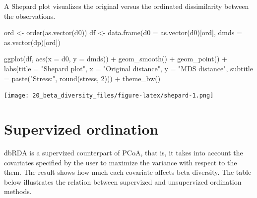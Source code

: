 \documentclass[
]{book}
\newenvironment{Shaded}{\begin{snugshade}}{\end{snugshade}}
\newcommand{\AttributeTok}[1]{\textcolor[rgb]{0.77,0.63,0.00}{#1}}
\newcommand{\DecValTok}[1]{\textcolor[rgb]{0.00,0.00,0.81}{#1}}
\newcommand{\FunctionTok}[1]{\textcolor[rgb]{0.00,0.00,0.00}{#1}}
\newcommand{\NormalTok}[1]{#1}
\newcommand{\OtherTok}[1]{\textcolor[rgb]{0.56,0.35,0.01}{#1}}
\newcommand{\SpecialCharTok}[1]{\textcolor[rgb]{0.00,0.00,0.00}{#1}}
\newcommand{\StringTok}[1]{\textcolor[rgb]{0.31,0.60,0.02}{#1}}
\begin{document}
A Shepard plot visualizes the original versus the ordinated dissimilarity
between the observations.

\begin{Shaded}
\begin{Highlighting}[]
\NormalTok{ord }\OtherTok{\textless{}{-}} \FunctionTok{order}\NormalTok{(}\FunctionTok{as.vector}\NormalTok{(d0))}
\NormalTok{df }\OtherTok{\textless{}{-}} \FunctionTok{data.frame}\NormalTok{(}\AttributeTok{d0 =} \FunctionTok{as.vector}\NormalTok{(d0)[ord],}
                 \AttributeTok{dmds =} \FunctionTok{as.vector}\NormalTok{(dp)[ord])}

\FunctionTok{ggplot}\NormalTok{(df, }\FunctionTok{aes}\NormalTok{(}\AttributeTok{x =}\NormalTok{ d0, }\AttributeTok{y =}\NormalTok{ dmds)) }\SpecialCharTok{+}
  \FunctionTok{geom\_smooth}\NormalTok{() }\SpecialCharTok{+}
  \FunctionTok{geom\_point}\NormalTok{() }\SpecialCharTok{+}    
  \FunctionTok{labs}\NormalTok{(}\AttributeTok{title =} \StringTok{"Shepard plot"}\NormalTok{,}
       \AttributeTok{x =} \StringTok{"Original distance"}\NormalTok{,}
       \AttributeTok{y =} \StringTok{"MDS distance"}\NormalTok{,   }
       \AttributeTok{subtitle =} \FunctionTok{paste}\NormalTok{(}\StringTok{"Stress:"}\NormalTok{, }\FunctionTok{round}\NormalTok{(stress, }\DecValTok{2}\NormalTok{))) }\SpecialCharTok{+}
  \FunctionTok{theme\_bw}\NormalTok{()}
\end{Highlighting}
\end{Shaded}

\texttt{[image: 20\_beta\_diversity\_files/figure-latex/shepard-1.png]}

\hypertarget{supervized-ordination}{%
\section{Supervized ordination}\label{supervized-ordination}}

dbRDA is a supervized counterpart of PCoA, that is, it takes into account the
covariates specified by the user to maximize the variance with respect to the
them. The result shows how much each covariate affects beta diversity. The table
below illustrates the relation between supervized and unsupervized ordination
methods.
\end{document}
